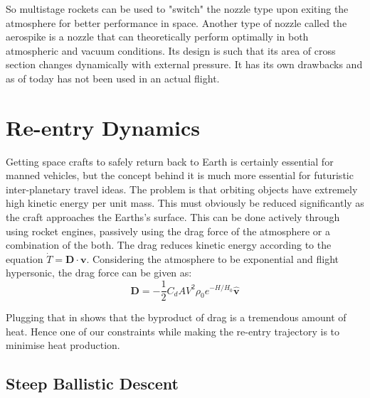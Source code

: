 \documentclass[12pt, letterpaper]{article}
\begin{document}
So multistage rockets can be used to "switch" the nozzle type upon exiting the atmosphere for better performance in space. Another type of nozzle called the aerospike is a nozzle that can theoretically perform optimally in both atmospheric and vacuum conditions. Its design is such that its area of cross section changes dynamically with external pressure. It has its own drawbacks and as of today has not been used in an actual flight.

\newpage

\section{Re-entry Dynamics}
Getting space crafts to safely return back to Earth is certainly essential for manned vehicles, but the concept behind it is much more essential for futuristic inter-planetary travel ideas. The problem is that orbiting objects have extremely high kinetic energy per unit mass. This must obviously be reduced significantly as the craft approaches the Earths's surface. This can be done actively through using rocket engines, passively using the drag force of the atmosphere or a combination of the both. The drag reduces kinetic energy according to the equation $\Dot{T} = \mathbf{D} \cdot \mathbf{v}$. Considering the atmosphere to be exponential and flight hypersonic, the drag force can be given as: 
\[
	\mathbf{D} = - \frac{1}{2} C_d A V^2 \rho_0 e ^ {-H/H_0} \hat{\mathbf{v}}
\]

Plugging that in shows that the byproduct of drag is a tremendous amount of heat. Hence one of our constraints while making the re-entry trajectory is to minimise heat production. 

\subsection{Steep Ballistic Descent}
\end{document}
